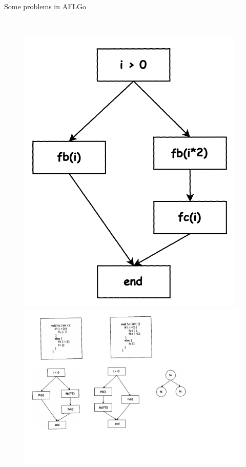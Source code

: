 \documentclass[10pt,aspectratio=43]{beamer}
\begin{document}
\begin{frame}{Some problems in AFLGo}
{\begin{figure}[htb]
\begin{minipage}[b]{0.35\linewidth}
            \end{minipage}
            \\
            \begin{minipage}[b]{0.35\linewidth}
                \includegraphics[width=0.65\linewidth]{pic/excfg1.pdf}
            \end{minipage}
            \begin{minipage}[b]{0.35\linewidth}
                \includegraphics[width=0.65\linewidth]{pic/excfg2.pdf}
            \end{minipage}
        \end{figure} 
    }
\end{frame}
\end{document}
